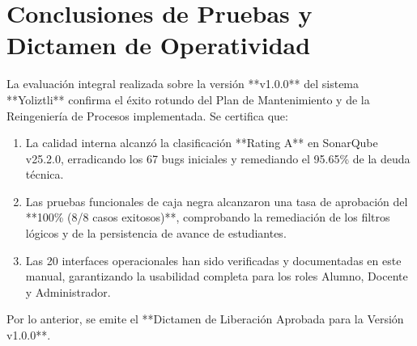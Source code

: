 \documentclass[12pt]{article}
\begin{document}
\section{Conclusiones de Pruebas y Dictamen de Operatividad}

La evaluación integral realizada sobre la versión **v1.0.0** del sistema **Yoliztli** confirma el éxito rotundo del Plan de Mantenimiento y de la Reingeniería de Procesos implementada. Se certifica que:
\begin{enumerate}
    \item La calidad interna alcanzó la clasificación **Rating A** en SonarQube v25.2.0, erradicando los 67 bugs iniciales y remediando el 95.65\% de la deuda técnica.
    \item Las pruebas funcionales de caja negra alcanzaron una tasa de aprobación del **100\% (8/8 casos exitosos)**, comprobando la remediación de los filtros lógicos y de la persistencia de avance de estudiantes.
    \item Las 20 interfaces operacionales han sido verificadas y documentadas en este manual, garantizando la usabilidad completa para los roles Alumno, Docente y Administrador.
\end{enumerate}

Por lo anterior, se emite el **Dictamen de Liberación Aprobada para la Versión v1.0.0**.
\end{document}
